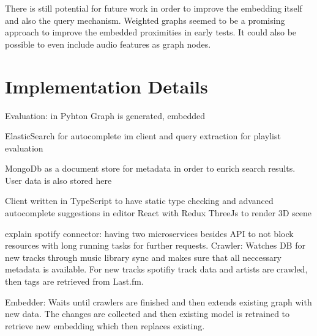 \documentclass[a4paper]{llncs}
\begin{document}
	There is still potential for future work in order to improve the embedding itself and also the query mechanism. Weighted graphs seemed to be a promising approach to improve the embedded proximities in early tests. It could also be possible to even include audio features as graph nodes.
	
	
	


	\newpage
	\appendix
	\section{Implementation Details}
	
	
	Evaluation:
	in Pyhton
	Graph is generated, embedded 
	
	
	ElasticSearch for autocomplete im client and query extraction for playlist evaluation
	
	MongoDb as a document store for metadata in order to enrich search results. User data is also stored here
	
	
	Client
	written in TypeScript to have static type checking and advanced autocomplete suggestions in editor
	React with Redux 
	ThreeJs to render 3D scene
	
	
	explain spotify connector:
	having two microservices besides API to not block resources with long running tasks for further requests. 
	Crawler: Watches DB for new tracks through music library sync and makes sure that all neccessary metadata is available. For new tracks spotifiy track data and artists are crawled, then tags are retrieved from Last.fm.
	
	Embedder: Waits until crawlers are finished and then extends existing graph with new data. The changes are collected and then existing model is retrained to retrieve new embedding which then replaces existing.
	
	
	
	
	
\end{document}
